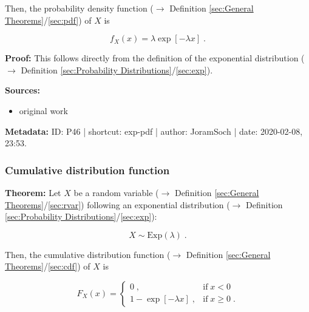 \documentclass[a4paper,12pt,twoside]{book}
\begin{document}
Then, the probability density function ($\rightarrow$ Definition \ref{sec:General Theorems}/\ref{sec:pdf}) of $X$ is

\begin{equation} \label{eq:exp-pdf-gam-pdf}
f_X(x) = \lambda \exp[-\lambda x] \; .
\end{equation}


\vspace{1em}
\textbf{Proof:} This follows directly from the definition of the exponential distribution ($\rightarrow$ Definition \ref{sec:Probability Distributions}/\ref{sec:exp}).


\vspace{1em}
\textbf{Sources:}
\begin{itemize}
\item original work\end{itemize}


\vspace{1em}
\textbf{Metadata:} ID: P46 | shortcut: exp-pdf | author: JoramSoch | date: 2020-02-08, 23:53.
\vspace{1em}



\subsubsection[\textbf{Cumulative distribution function}]{Cumulative distribution function} \label{sec:exp-cdf}
\setcounter{equation}{0}

\textbf{Theorem:} Let $X$ be a random variable ($\rightarrow$ Definition \ref{sec:General Theorems}/\ref{sec:rvar}) following an exponential distribution ($\rightarrow$ Definition \ref{sec:Probability Distributions}/\ref{sec:exp}):

\begin{equation} \label{eq:exp-cdf-exp}
X \sim \mathrm{Exp}(\lambda) \; .
\end{equation}

Then, the cumulative distribution function ($\rightarrow$ Definition \ref{sec:General Theorems}/\ref{sec:cdf}) of $X$ is

\begin{equation} \label{eq:exp-cdf-exp-cdf}
F_X(x) = \left\{
\begin{array}{rl}
0 \; , & \text{if} \; x < 0 \\
1 - \exp[-\lambda x] \; , & \text{if} \; x \geq 0 \; .
\end{array}
\right.
\end{equation}
\end{document}
